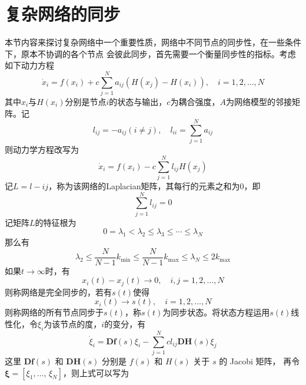 \section{复杂网络的同步}
本节内容来探讨复杂网络中一个重要性质，网络中不同节点的同步性，在一些条件下，原本不协调的各个节点
会彼此同步，首先需要一个衡量同步性的指标。考虑如下动力方程
\begin{equation}
    \dot{x}_i=f\left(x_i\right)+c \sum_{j=1}^N a_{i j}\left(H\left(x_j\right)-H\left(x_i\right)\right), \quad i=1,2, \ldots, N
\end{equation}
其中$x_i$与$H(x_i)$分别是节点$i$的状态与输出，$c$为耦合强度，$A$为网络模型的邻接矩阵。记
\begin{equation}
    l_{i j}=-a_{i j}(i \neq j), \quad l_{i i}=\sum_{j=1}^N a_{i j}
\end{equation}
则动力学方程改写为
\begin{equation}
    \dot{x}_i=f\left(x_i\right)-c \sum_{j=1}^N l_{i j} H\left(x_j\right)
\end{equation}
记$L=l-{ij}$，称为该网络的Laplacian矩阵，其每行的元素之和为0，即
\begin{equation}
    \sum_{j=1}^N l_{i j}=0
\end{equation}
记矩阵$L$的特征根为
\begin{equation}
    0=\lambda_1<\lambda_2 \leqslant \lambda_3 \leqslant \cdots \leqslant \lambda_N
\end{equation}
那么有
\begin{equation}
    \lambda_2 \leqslant \frac{N}{N-1} k_{\min } \leqslant \frac{N}{N-1} k_{\max } \leqslant \lambda_N \leqslant 2 k_{\max }
\end{equation}
如果$t \longrightarrow \infty$时，有
\begin{equation}
    x_i(t)-x_j(t) \rightarrow 0, \quad i, j=1,2, \ldots, N
\end{equation}
则称网络是完全同步的，若有$s(t)$使得
\begin{equation}
    x_i(t) \rightarrow s(t), \quad i=1,2, \ldots, N
\end{equation}
则称网络的所有节点同步于$s(t)$，称$s(t)$为同步状态。将状态方程运用$s(t)$线性化，令$\xi_i$为该节点的度，$i$的变分，有
\begin{equation}
    \dot{\xi}_i=\boldsymbol{D} \boldsymbol{f}(s) \xi_i-\sum_{j=1}^N c l_{i j} \boldsymbol{D} \boldsymbol{H}(s) \xi_j
\end{equation}
这里 $\boldsymbol{D} \boldsymbol{f}(s)$ 和 $\boldsymbol{D} \boldsymbol{H}(s)$ 分别是 $f(s)$ 和 $H(s)$ 关于 $s$ 的 Jacobi 矩阵，
再令 $\boldsymbol{\xi}=\left[\xi_1, \ldots\right.$, $\left.\xi_N\right]$，则上式可以写为

